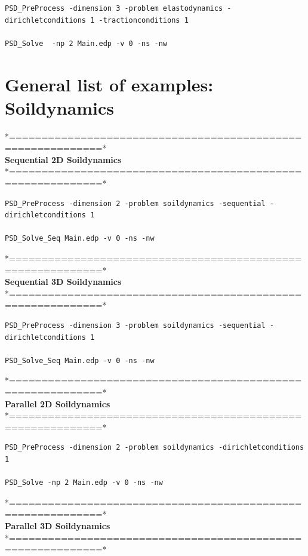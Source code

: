 {{\begin{lstlisting}[style=BashInputStyle]
PSD_PreProcess -dimension 3 -problem elastodynamics -dirichletconditions 1 -tractionconditions 1 

PSD_Solve  -np 2 Main.edp -v 0 -ns -nw
\end{lstlisting}

\section{General list of examples: Soildynamics} 

*============================================================*\\
\textbf{ Sequential 2D Soildynamics }    \\                   
*============================================================*\\

\begin{lstlisting}[style=BashInputStyle]
PSD_PreProcess -dimension 2 -problem soildynamics -sequential -dirichletconditions 1  

PSD_Solve_Seq Main.edp -v 0 -ns -nw
\end{lstlisting}
*============================================================*\\
\textbf{ Sequential 3D Soildynamics  }  \\                    
*============================================================*\\

\begin{lstlisting}[style=BashInputStyle]
PSD_PreProcess -dimension 3 -problem soildynamics -sequential -dirichletconditions 1  

PSD_Solve_Seq Main.edp -v 0 -ns -nw
\end{lstlisting}
*============================================================*\\
\textbf{ Parallel 2D Soildynamics  }  \\                    
*============================================================*\\

\begin{lstlisting}[style=BashInputStyle]
PSD_PreProcess -dimension 2 -problem soildynamics -dirichletconditions 1  

PSD_Solve -np 2 Main.edp -v 0 -ns -nw
\end{lstlisting}
*============================================================*\\
\textbf{ Parallel 3D Soildynamics  }     \\                 
*============================================================*\\

}}

